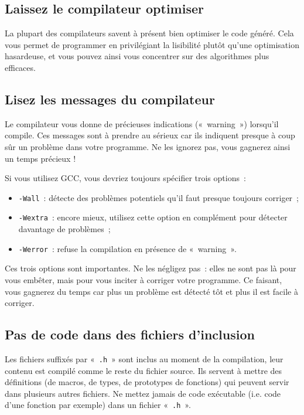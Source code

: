\documentclass {article}
\begin{document}
\subsection {Laissez le compilateur optimiser}

La plupart des compilateurs savent à présent bien optimiser le code
généré. Cela vous permet de programmer en privilégiant la lisibilité
plutôt qu'une optimisation hasardeuse, et vous pouvez ainsi vous
concentrer sur des algorithmes plus efficaces.


\subsection {Lisez les messages du compilateur}

Le compilateur vous donne de précieuses indications («~warning~»)
lorsqu'il compile. Ces messages sont à prendre au sérieux car ils
indiquent presque à coup sûr un problème dans votre programme. Ne
les ignorez pas, vous gagnerez ainsi un temps précieux !

Si vous utilisez GCC, vous devriez toujours spécifier trois options~:
\begin {itemize}
    \item \texttt {-Wall}~: détecte des problèmes potentiels qu'il
	faut presque toujours corriger~;
    \item \texttt {-Wextra}~: encore mieux, utilisez
	cette option en complément pour détecter davantage
	de problèmes~;
    \item \texttt {-Werror}~: refuse la compilation en présence de
	«~warning~».
\end {itemize}

Ces trois options sont importantes. Ne les négligez pas~: elles
ne sont pas là pour vous embêter, mais pour vous inciter à corriger votre
programme. Ce faisant, vous gagnerez du temps car plus un problème est
détecté tôt et plus il est facile à corriger.

\subsection {Pas de code dans des fichiers d'inclusion}

Les fichiers suffixés par «~\texttt {.h}~» sont inclus
au moment de la compilation, leur contenu est compilé comme le reste
du fichier source. Ils servent à mettre des définitions (de macros,
de types, de prototypes de fonctions) qui peuvent servir dans plusieurs
autres fichiers. Ne mettez jamais de code exécutable (i.e. code d'une
fonction par exemple) dans un fichier «~\texttt {.h}~».
\end{document}
